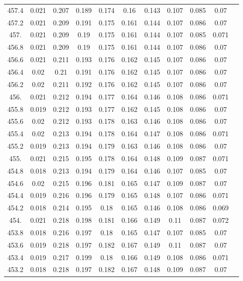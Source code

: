 \documentclass[12pt]{ctexart}
\numberwithin{equation}{section}
\begin{document}
\begin{longtable}{ccccccccccc}
457.4	&	0.021	&	0.207	&	0.189	&	0.174	&	0.16	&	0.143	&	0.107	&	0.085	&	0.07	\\
457.2	&	0.021	&	0.209	&	0.191	&	0.175	&	0.161	&	0.144	&	0.107	&	0.086	&	0.07	\\
457.	&	0.021	&	0.209	&	0.19	&	0.175	&	0.161	&	0.144	&	0.107	&	0.085	&	0.071	\\
456.8	&	0.021	&	0.209	&	0.19	&	0.175	&	0.161	&	0.144	&	0.107	&	0.086	&	0.07	\\
456.6	&	0.021	&	0.211	&	0.193	&	0.176	&	0.162	&	0.145	&	0.107	&	0.086	&	0.07	\\
456.4	&	0.02	&	0.21	&	0.191	&	0.176	&	0.162	&	0.145	&	0.107	&	0.086	&	0.07	\\
456.2	&	0.02	&	0.211	&	0.192	&	0.176	&	0.162	&	0.145	&	0.107	&	0.086	&	0.07	\\
456.	&	0.021	&	0.212	&	0.194	&	0.177	&	0.164	&	0.146	&	0.108	&	0.086	&	0.071	\\
455.8	&	0.019	&	0.212	&	0.193	&	0.177	&	0.162	&	0.145	&	0.108	&	0.086	&	0.07	\\
455.6	&	0.02	&	0.212	&	0.193	&	0.178	&	0.163	&	0.146	&	0.108	&	0.086	&	0.07	\\
455.4	&	0.02	&	0.213	&	0.194	&	0.178	&	0.164	&	0.147	&	0.108	&	0.086	&	0.071	\\
455.2	&	0.019	&	0.213	&	0.194	&	0.179	&	0.163	&	0.146	&	0.108	&	0.086	&	0.07	\\
455.	&	0.021	&	0.215	&	0.195	&	0.178	&	0.164	&	0.148	&	0.109	&	0.087	&	0.071	\\
454.8	&	0.018	&	0.213	&	0.194	&	0.179	&	0.164	&	0.146	&	0.107	&	0.085	&	0.07	\\
454.6	&	0.02	&	0.215	&	0.196	&	0.181	&	0.165	&	0.147	&	0.109	&	0.087	&	0.07	\\
454.4	&	0.019	&	0.216	&	0.196	&	0.179	&	0.165	&	0.148	&	0.107	&	0.086	&	0.071	\\
454.2	&	0.018	&	0.214	&	0.195	&	0.18	&	0.165	&	0.146	&	0.108	&	0.086	&	0.069	\\
454.	&	0.021	&	0.218	&	0.198	&	0.181	&	0.166	&	0.149	&	0.11	&	0.087	&	0.072	\\
453.8	&	0.018	&	0.216	&	0.197	&	0.18	&	0.165	&	0.147	&	0.107	&	0.085	&	0.07	\\
453.6	&	0.019	&	0.218	&	0.197	&	0.182	&	0.167	&	0.149	&	0.11	&	0.087	&	0.07	\\
453.4	&	0.019	&	0.217	&	0.199	&	0.18	&	0.166	&	0.149	&	0.108	&	0.086	&	0.071	\\
453.2	&	0.018	&	0.218	&	0.197	&	0.182	&	0.167	&	0.148	&	0.109	&	0.087	&	0.07	\\

\end{longtable}
\end{document}
